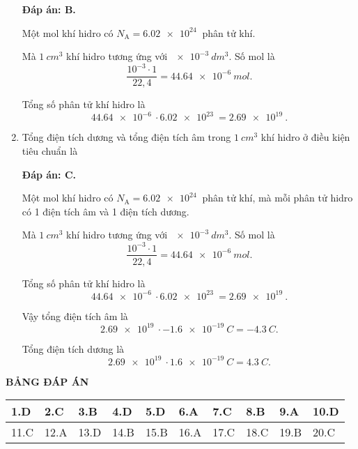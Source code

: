 \begin{enumerate}[label=\bfseries Câu \arabic*:]
{	}
	\loigiai
	{	\textbf{Đáp án: B.}
		
		Một mol khí hidro có $N_\text{A} = \SI{6.02e24}{}$ phân tử khí.
		
		Mà $\SI{1}{cm^3}$ khí hidro tương ứng với $\SI{e-3}{dm^3}$. Số mol là
		$$\dfrac{10^{-3} \cdot 1}{22,4} = \SI{44.64e-6}{mol}.$$
		
		Tổng số phân tử khí hidro là
		$$\SI{44.64e-6}{} \cdot \SI{6.02e23}{} = \SI{2.69e19}{}.$$
	}
	\item {}
	
	\cauhoi
	{Tổng điện tích dương và tổng điện tích âm trong $\SI{1}{cm^3}$ khí hidro ở điều kiện tiêu chuẩn là
		
	}
	\loigiai
	{	\textbf{Đáp án: C.}
		
		Một mol khí hidro có $N_\text{A} = \SI{6.02e24}{}$ phân tử khí, mà mỗi phân tử hidro có 1 điện tích âm và 1 điện tích dương.
		
		Mà $\SI{1}{cm^3}$ khí hidro tương ứng với $\SI{e-3}{dm^3}$. Số mol là
		$$\dfrac{10^{-3} \cdot 1}{22,4} = \SI{44.64e-6}{mol}.$$
		
		Tổng số phân tử khí hidro là
		$$\SI{44.64e-6}{} \cdot \SI{6.02e23}{} = \SI{2.69e19}{}.$$
		
		Vậy tổng điện tích âm là
		$$\SI{2.69e19}{} \cdot \SI{-1.6e-19}{C} = \SI{-4.3}{C}.$$
		
		Tổng điện tích dương là
		$$\SI{2.69e19}{} \cdot \SI{1.6e-19}{C} = \SI{4.3}{C}.$$
	}
\end{enumerate}

\whiteBGstarEnd

\loigiai
{
	\begin{center}
		\textbf{BẢNG ĐÁP ÁN}
	\end{center}
	\begin{center}
		\begin{tabular}{|m{2.8em}|m{2.8em}|m{2.8em}|m{2.8em}|m{2.8em}|m{2.8em}|m{2.8em}|m{2.8em}|m{2.8em}|m{2.8em}|}
			\hline
			1.D  & 2.C  & 3.B  & 4.D  & 5.D & 6.A  & 7.C  & 8.B  & 9.A  & 10.D  \\
			\hline
			11.C  & 12.A  & 13.D  & 14.B  & 15.B  & 16.A  & 17.C  & 18.C  & 19.B  & 20.C  \\
			\hline
		\end{tabular}
	\end{center}
}
